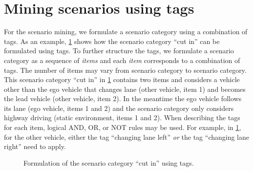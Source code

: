 \section{Mining scenarios using tags}
\label{sec:mining}

\cstartd
For the scenario mining, we formulate a scenario category using a combination of tags.
As an example, \cref{fig:cutin formulation tags} shows how the scenario category ``cut in'' can be formulated using tags.
To further structure the tags, we formulate a scenario category as a sequence of \emph{items} and each \emph{item} corresponds to a combination of tags.
The number of items may vary from scenario category to scenario category.
This scenario category ``cut in'' in \cref{fig:cutin formulation tags} contains two items and considers a vehicle other than the ego vehicle that changes lane (other vehicle, item 1) and becomes the lead vehicle (other vehicle, item 2).
In the meantime the ego vehicle follows its lane (ego vehicle, items 1 and 2) and the scenario category only considers highway driving (static environment, items 1 and 2).
When describing the tags for each item, logical AND, OR, or NOT rules may be used. 
For example, in \cref{fig:cutin formulation tags}, for the other vehicle, either the tag ``changing lane left'' \emph{or} the tag ``changing lane right'' need to apply.
\cendd

\begin{figure}
	\centering
	
	\caption{\cstartd Formulation of the scenario category ``cut in'' using tags.\cendd}
	\label{fig:cutin formulation tags}
\end{figure}


